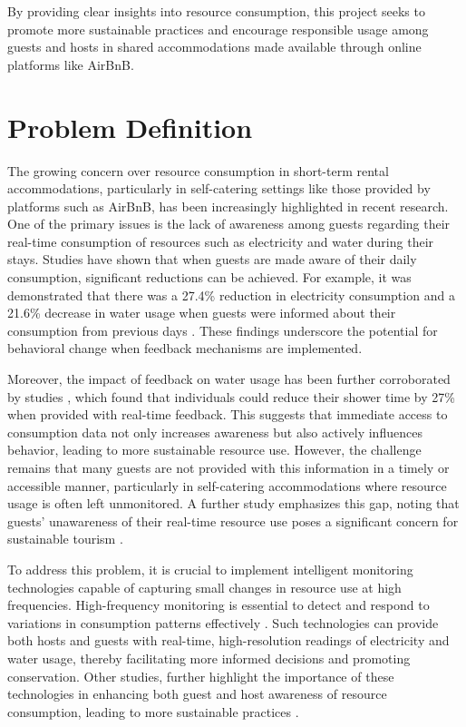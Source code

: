 By providing clear insights into resource consumption, this project seeks to promote more sustainable practices and 
encourage responsible usage among guests and hosts in shared accommodations made available through online platforms like 
AirBnB.

\section{Problem Definition}

The growing concern over resource consumption in short-term rental accommodations, particularly in self-catering 
settings like those provided by platforms such as AirBnB, has been increasingly highlighted in recent research. One of 
the primary issues is the lack of awareness among guests regarding their real-time consumption of resources such as 
electricity and water during their stays. Studies have shown that when guests are made aware of their daily consumption, 
significant reductions can be achieved. For example, it was demonstrated that there was a 27.4\% reduction in 
electricity consumption and a 21.6\% decrease in water usage when guests were informed about their consumption from 
previous days \cite{Warren2018b}. These findings underscore the potential for behavioral change when feedback mechanisms 
are implemented.

Moreover, the impact of feedback on water usage has been further corroborated by studies \cite{Stewart2013}, which found 
that individuals could reduce their shower time by 27\% when provided with real-time feedback. This suggests that 
immediate access to consumption data not only increases awareness but also actively influences behavior, leading to more 
sustainable resource use. However, the challenge remains that many guests are not provided with this information in a 
timely or accessible manner, particularly in self-catering accommodations where resource usage is often left 
unmonitored. A further study emphasizes this gap, noting that guests' unawareness of their real-time resource use poses 
a significant concern for sustainable tourism \cite{Juvan2014}.

To address this problem, it is crucial to implement intelligent monitoring technologies capable of capturing small 
changes in resource use at high frequencies. High-frequency monitoring is essential to detect and respond to variations 
in consumption patterns effectively \cite{Jos2016}. Such technologies can provide both hosts and 
guests with real-time, high-resolution readings of electricity and water usage, thereby facilitating more informed 
decisions and promoting conservation. Other studies, further highlight the importance of these technologies in enhancing 
both guest and host awareness of resource consumption, leading to more sustainable practices \cite{Warren2018a}.

